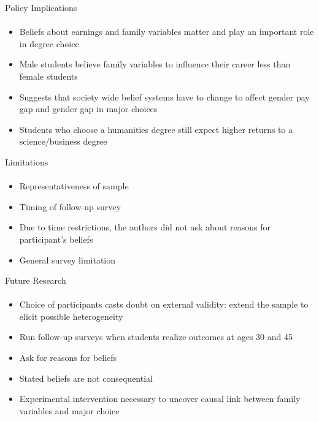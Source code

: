 \documentclass[12pt]{beamer}
\begin{document}
\begin{frame}{Policy Implications}
    \framesubtitle{} 
    \begin{itemize}
        \item Beliefs about earnings and family variables matter and play an important role in degree choice 
        \item Male students believe family variables to influence their career less than female students  
        \item Suggests that society wide belief systems have to change to affect gender pay gap and gender gap in major choices 
        \item Students who choose a humanities degree still expect higher returns to a science/business degree
    \end{itemize}
\end{frame}

\begin{frame}{Limitations}
    \framesubtitle{} 
    \begin{itemize}
        \item Representativeness of sample
        \item Timing of follow-up survey
        \item Due to time restrictions, the authors did not ask about reasons for participant's beliefs
        \item General survey limitation
    \end{itemize}
\end{frame}

\begin{frame}{Future Research}
    \framesubtitle{} 
    \begin{itemize}
        \item Choice of participants casts doubt on external validity: extend the sample to elicit possible heterogeneity
        \item Run follow-up surveys when students realize outcomes at ages 30 and 45
        \item Ask for reasons for beliefs
        \item Stated beliefs are not consequential
        \item Experimental intervention necessary to uncover causal link between family variables and major choice 
    \end{itemize}
\end{frame}
\end{document}
